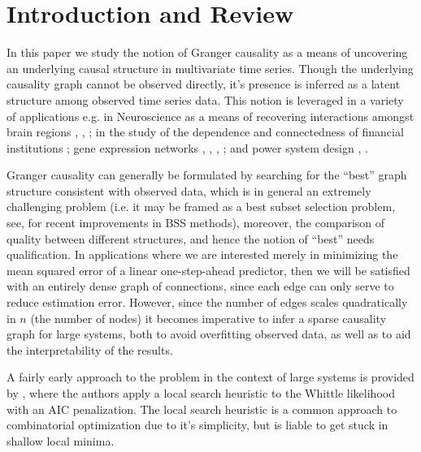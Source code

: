 \documentclass[12pt]{article}
\begin{document}
\section{Introduction and Review}
\label{sec:introduction}
In this paper we study the notion of Granger causality
\cite{granger1969investigating} \cite{Granger1980329} as a means of
uncovering an underlying causal structure in multivariate time series.
Though the underlying causality graph cannot be observed directly,
it's presence is inferred as a latent structure among observed time
series data.  This notion is leveraged in a variety of applications
e.g. in Neuroscience as a means of recovering interactions amongst
brain regions \cite{bressler2011wiener}, \cite{anna_paper2008},
\cite{david2008identifying}; in the study of the dependence and
connectedness of financial institutions \cite{NBERw16223}; gene
expression networks \cite{Fujita2007},
\cite{methods_for_inferring_gene_regulatory_networks_from_time_series_expression_data},
\cite{grouped_graphical_granger_modelling_for_gene_expression_regulatory_networks_discovery},
\cite{discovering_graphical_Granger_causality_using_the_truncating_lasso_penalty};
and power system design \cite{Misyrlis2016450}, \cite{yuan2014root}.

Granger causality can generally be formulated by searching for the
``best'' graph structure consistent with observed data, which is in
general an extremely challenging problem (i.e. it may be framed as a
best subset selection problem, see, \cite{hastie_bss_comp} for recent
improvements in BSS methods), moreover, the comparison of quality
between different structures, and hence the notion of ``best'' needs
qualification.  In applications where we are interested merely in
minimizing the mean squared error of a linear one-step-ahead
predictor, then we will be satisfied with an entirely dense graph of
connections, since each edge can only serve to reduce estimation
error.  However, since the number of edges scales quadratically in $n$
(the number of nodes) it becomes imperative to infer a sparse
causality graph for large systems, both to avoid overfitting observed
data, as well as to aid the interpretability of the results.

A fairly early approach to the problem in the context of large systems
is provided by \cite{bach2004learning}, where the authors apply a
local search heuristic to the Whittle likelihood with an AIC
penalization.  The local search heuristic is a common approach to
combinatorial optimization due to it's simplicity, but is liable to
get stuck in shallow local minima.
\end{document}

